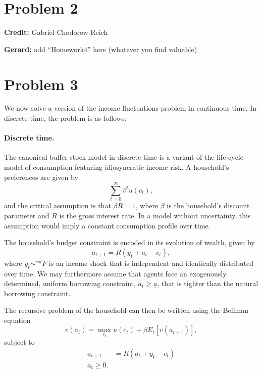 \documentclass[11pt]{extarticle}
\theoremstyle{plain}
\theoremstyle{definition}
\begin{document}
\section*{Problem 2}

\textbf{Credit:} Gabriel Chodorow-Reich

\vspace{5mm}
\noindent
\textbf{Gerard:} add ``Homework4'' here (whatever you find valuable)




\vspace{10mm}
\section*{Problem 3}

We now solve a version of the income fluctuations problem in continuous time. In discrete time, the problem is as follows:


\paragraph{Discrete time.} The canonical buffer stock model in discrete-time is a variant of the life-cycle model of consumption featuring idiosyncratic income risk. A household's preferences are given by 
\begin{equation}
	\sum_{t=0}^\infty \beta^t u(c_t),
\end{equation}
and the critical assumption is that $\beta R = 1$, where $\beta$ is the household's discount parameter and $R$ is the gross interest rate. In a model without uncertainty, this assumption would imply a constant consumption profile over time.

The household's budget constraint is encoded in its evolution of wealth, given by 
\begin{equation}
	a_{t+1} = R(y_t + a_t - c_t),
\end{equation}
where $y_t \sim^{iid} F$ is an income shock that is independent and identically distributed over time. We may furthermore assume that agents face an exogenously determined, uniform borrowing constraint, $a_t \geq \underline{a}$, that is tighter than the natural borrowing constraint. 

The recursive problem of the household can then be written using the Bellman equation
\begin{equation}
	v(a_t) = \max_{c_t} u(c_t) + \beta E_t[v(a_{t+1})],
\end{equation}
subject to 
\begin{align*}
	a_{t+1} &= R(a_t + y_t - c_t) \\
	a_{t} \geq 0.
\end{align*}
\end{document}
